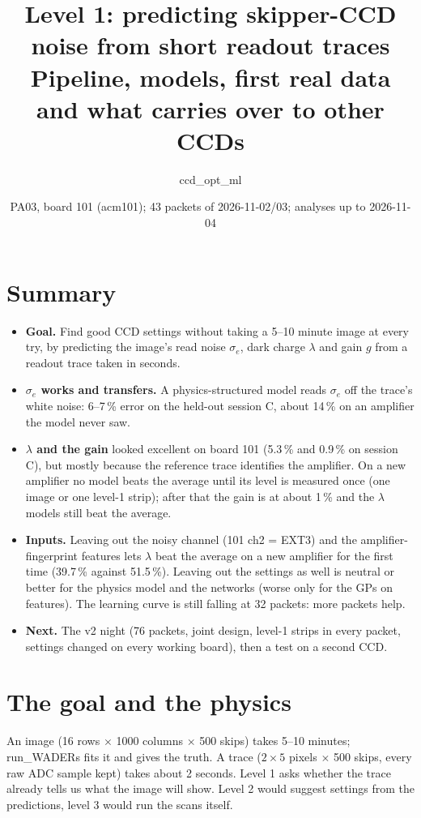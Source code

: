 \documentclass[11pt]{article}
\title{Level 1: predicting skipper-CCD noise from short readout traces\\[3pt]
\large Pipeline, models, first real data and what carries over to other CCDs}
\author{ccd\_opt\_ml}
\date{PA03, board 101 (acm101); 43 packets of 2026-11-02/03; analyses up to 2026-11-04}
\begin{document}
\maketitle

\section*{Summary}
\begin{itemize}
\item \textbf{Goal.} Find good CCD settings without taking a 5--10 minute image at every try, by predicting the image's
  read noise $\sigma_e$, dark charge $\lambda$ and gain $g$ from a readout trace taken in seconds.
\item \textbf{$\sigma_e$ works and transfers.} A physics-structured model reads $\sigma_e$ off the trace's white noise:
  6--7\,\% error on the held-out session C, about 14\,\% on an amplifier the model never saw.
\item \textbf{$\lambda$ and the gain} looked excellent on board 101 (5.3\,\% and 0.9\,\% on session C), but mostly
  because the reference trace identifies the amplifier. On a new amplifier no model beats the average until its level is
  measured once (one image or one level-1 strip); after that the gain is at about 1\,\% and the $\lambda$ models still
  beat the average.
\item \textbf{Inputs.} Leaving out the noisy channel (101 ch2 = EXT3) and the amplifier-fingerprint features lets
  $\lambda$ beat the average on a new amplifier for the first time (39.7\,\% against 51.5\,\%). Leaving out the settings
  as well is neutral or better for the physics model and the networks (worse only for the GPs on features). The
  learning curve is still falling at 32 packets: more packets help.
\item \textbf{Next.} The v2 night (76 packets, joint design, level-1 strips in every packet, settings changed on every
  working board), then a test on a second CCD.
\end{itemize}

\section{The goal and the physics}

An image (16 rows $\times$ 1000 columns $\times$ 500 skips) takes 5--10 minutes; run\_WADERs fits it and gives the
truth. A trace ($2\times5$ pixels $\times$ 500 skips, every raw ADC sample kept) takes about 2 seconds. Level 1 asks
whether the trace already tells us what the image will show. Level 2 would suggest settings from the predictions,
level 3 would run the scans itself.
\end{document}
